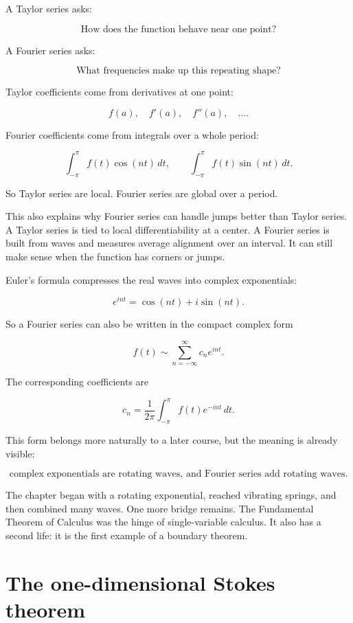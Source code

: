 A Taylor series asks:

\[
\text{How does the function behave near one point?}
\]

A Fourier series asks:

\[
\text{What frequencies make up this repeating shape?}
\]

Taylor coefficients come from derivatives at one point:

\[
f(a),\quad f'(a),\quad f''(a),\quad \ldots.
\]

Fourier coefficients come from integrals over a whole period:

\[
\int_{-\pi}^{\pi} f(t)\cos(nt)\,dt,
\qquad
\int_{-\pi}^{\pi} f(t)\sin(nt)\,dt.
\]

So Taylor series are local.  Fourier series are global over a period.

This also explains why Fourier series can handle jumps better than Taylor series.  A
Taylor series is tied to local differentiability at a center.  A Fourier series is built from
waves and measures average alignment over an interval.  It can still make sense when
the function has corners or jumps.

Euler's formula compresses the real waves into complex exponentials:

\[
e^{int}=\cos(nt)+i\sin(nt).
\]

So a Fourier series can also be written in the compact complex form

\[
\boxed{
f(t)\sim\sum_{n=-\infty}^{\infty} c_n e^{int}.
}
\]

The corresponding coefficients are

\[
\boxed{
c_n=
\frac{1}{2\pi}
\int_{-\pi}^{\pi} f(t)e^{-int}\,dt.
}
\]

This form belongs more naturally to a later course, but the meaning is already visible:

\[
\boxed{
\text{complex exponentials are rotating waves, and Fourier series add rotating waves.}
}
\]

The chapter began with a rotating exponential, reached vibrating springs, and then
combined many waves.  One more bridge remains.  The Fundamental Theorem of
Calculus was the hinge of single-variable calculus.  It also has a second life: it is the
first example of a boundary theorem.

\section{The one-dimensional Stokes theorem}
\label{sec:one-dimensional-stokes-theorem}

